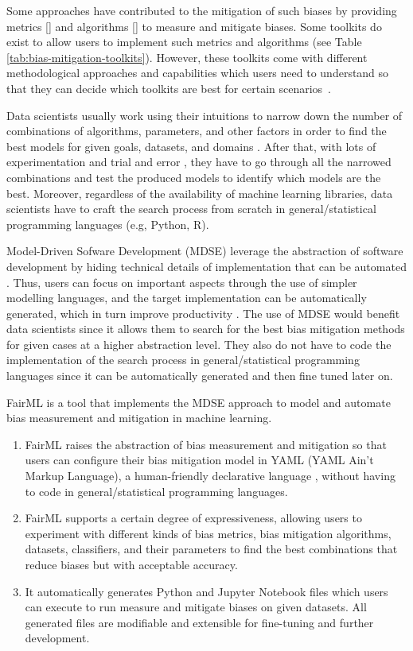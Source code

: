 \documentclass[final,5p,times,twocolumn]{elsarticle}
\begin{document}
Some approaches have contributed to the mitigation of such biases by providing metrics []  and algorithms [] to measure and mitigate biases. Some toolkits do exist to allow users to implement such metrics and algorithms (see Table \ref{tab:bias-mitigation-toolkits}).
However, these toolkits come with different methodological approaches and capabilities which users need to understand so that they can decide which toolkits are best for certain scenarios~\cite{lee2021landscape}.  

Data scientists usually work using their intuitions to narrow down the number of combinations of algorithms, parameters, and other factors in order to find the best models for given goals, datasets, and domains \cite{muller2016introduction}. After that, with lots of experimentation and trial and error \cite{byrne2017development}, they have to go through all the narrowed combinations and test the produced models to identify which models are the best. Moreover, regardless of the availability of machine learning libraries, data scientists have to craft the search process from scratch in general/statistical programming languages (e.g, Python, R).

Model-Driven Sofware Development (MDSE) leverage the abstraction of software development by hiding technical details of implementation that can be automated \cite{brambilla2017model}. Thus, users can focus on important aspects through the use of simpler modelling languages, and the target implementation can be automatically generated, which in turn improve productivity \cite{volter2013model}. The use of MDSE would benefit data scientists since it allows them to search for the best bias mitigation methods for given cases at a higher abstraction level. They also do not have to code the implementation of the search process in general/statistical programming languages since it can be automatically generated and then fine tuned later on. 

FairML is a tool that implements the MDSE approach to model and automate bias measurement and mitigation in machine learning. 
\begin{enumerate}
	\item FairML raises the abstraction of bias measurement and mitigation so that users can configure their bias mitigation model in YAML (YAML Ain’t Markup Language), a human-friendly declarative language \cite{evans2017yaml}, without having to code in general/statistical programming languages.
	\item FairML supports a certain degree of expressiveness, allowing users to experiment with different kinds of bias metrics, bias mitigation algorithms, datasets, classifiers, and their parameters to find the best combinations that reduce biases but with acceptable accuracy.
	\item It automatically generates Python and Jupyter Notebook files which users can execute to run measure and mitigate biases on given datasets. All generated files are modifiable and extensible for fine-tuning and further development.
\end{enumerate}
\end{document}
